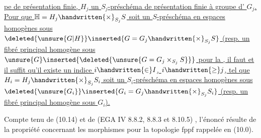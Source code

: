 \uline{pe de présentation finie, $H_j$ un $S_j$-préschéma de présentation finie à groupe d' $G_j$. Pour que $\mathbb{H}=H_j\handwritten{\times}_{S_j}S$ soit un $S$-préschéma en espaces homogènes sous $\deleted{\unsure{G|H}}\inserted{G=G_j\handwritten{\times}_{S_j}S}$ (resp. un fibré principal homogène sous $\unsure{G}\inserted{\deleted{\unsure{G=G_j\times_{S_j}S}}}$\unsure{)} pour la }\uline{, il faut et il suffit qu'il existe un indice $i\handwritten{\in}I$, $i\handwritten{\geq}j$, tel que $H_i=H_j\handwritten{\times}_{S_j}S_i$ soit un $S_i$-préschéma en espaces homogènes sous $\deleted{\unsure{G_i}}\inserted{G_i=G_j\handwritten{\times}_{S_j}S_i}$ (resp. un fibré principal homogène sous $G_i$).}

Compte tenu de (10.14) et de (EGA IV 8.8.2, 8.8.3 et 8.10.5) ,  l'énoncé résulte de la propriété concernant les morphismes  pour la topologie fppf rappelée en (10.0).

